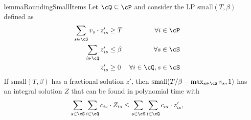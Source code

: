 \documentclass[a4paper,USenglish,cleveref,thm-restate]{lipics-v2021}
\begin{document}
\begin{restatable}{lemma}{RoundingSmallItems}
    \label{lem:rounding-small-items}
    Let $\cQ \subseteq \cP$ and consider the LP $\mathrm{small}(T, \beta)$ defined as
    \begin{align*}
        \sum_{s\in \cS} v_s \cdot z'_{is} &\ge T &\forall i\in\cP \\
        \sum_{i\in \cQ} z'_{is} &\le \beta &\forall s\in\cS\\
        z'_{is} &\ge 0 &\forall i\in \cQ, s\in \cS
    \end{align*}
    If $\mathrm{small}(T, \beta)$ has a fractional solution $z'$,
    then $\mathrm{small}(T/\beta - \max_{s\in\cS} v_s, 1)$ has an integral solution $Z$ that can be found in polynomial time with
    \begin{equation*}
       \sum_{s\in\cS}\sum_{i\in\cQ} c_{is}\cdot Z_{is}     
       \le \sum_{s\in\cS}\sum_{i\in\cQ} c_{is}\cdot z'_{is},
    \end{equation*}
\end{restatable}
\end{document}
